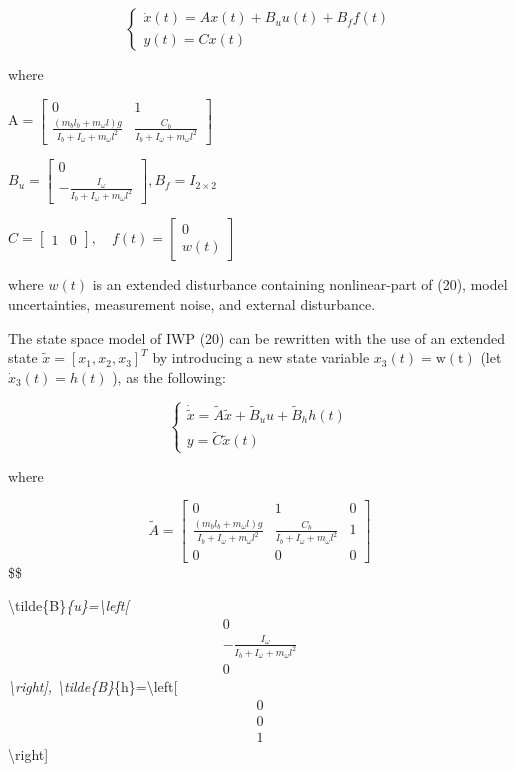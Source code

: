 \documentclass[10pt]{article}
\begin{document}
$$
\left\{\begin{array}{l}
\dot{x}(t)=A x(t)+B_{u} u(t)+B_{f} f(t) \\
y(t)=C x(t)
\end{array}\right.
$$

where

$\mathrm{A}=\left[\begin{array}{cc}0 & 1 \\ \frac{\left(m_{b} l_{b}+m_{\omega} l\right) g}{I_{b}+I_{\omega}+m_{\omega} l^{2}} & \frac{C_{b}}{I_{b}+I_{\omega}+m_{\omega} l^{2}}\end{array}\right]$

$B_{u}=\left[\begin{array}{c}0 \\ -\frac{I_{\omega}}{I_{b}+I_{\omega}+m_{\omega} l^{2}}\end{array}\right], B_{f}=I_{2 \times 2}$

$C=\left[\begin{array}{ll}1 & 0\end{array}\right], \quad f(t)=\left[\begin{array}{c}0 \\ w(t)\end{array}\right]$

where $w(t)$ is an extended disturbance containing nonlinear-part of (20), model uncertainties, measurement noise, and external disturbance.

The state space model of IWP (20) can be rewritten with the use of an extended state $\tilde{x}=\left[x_{1}, x_{2}, x_{3}\right]^{T}$ by introducing a new state variable $x_{3}(t)=\mathrm{w}(\mathrm{t})$ (let $\dot{x}_{3}(t)=h(t)$ ), as the following:

$$
\left\{\begin{array}{l}
\dot{\tilde{x}}=\tilde{A} \tilde{x}+\tilde{B}_{u} u+\tilde{B}_{h} h(t) \\
y=\tilde{C} \tilde{x}(t)
\end{array}\right.
$$

where

$$
\tilde{A}=\left[\begin{array}{ccc}
0 & 1 & 0 \\
\frac{\left(m_{b} l_{b}+m_{\omega} l\right) g}{I_{b}+I_{\omega}+m_{\omega} l^{2}} & \frac{C_{b}}{I_{b}+I_{\omega}+m_{\omega} l^{2}} & 1 \\
0 & 0 & 0
\end{array}\right]
$$\$\$

\textbackslash tilde\{B\}\textit{\{u\}=\textbackslash left[\[
\begin{array}{c}
0 \\
-\frac{I_{\omega}}{I_{b}+I_{\omega}+m_{\omega} l^{2}} \\
0
\end{array}
\]\textbackslash right], \textbackslash tilde\{B\}}\{h\}=\textbackslash left[\[
\begin{array}{l}
0 \\
0 \\
1
\end{array}
\]\textbackslash right]
\end{document}

